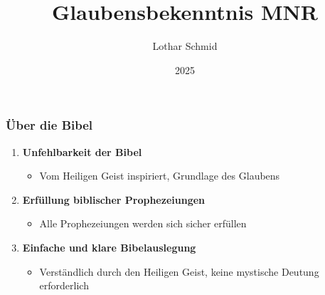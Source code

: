 \documentclass[aspectratio=43]{beamer}
\title{Glaubensbekenntnis MNR}
\author{Lothar Schmid}
\date{2025}
\begin{document}
\begin{frame}
    \maketitle    
\end{frame}

\begin{frame}
    \frametitle{Über die Bibel}  %
    \parbox{\textwidth}{%
            \begin{enumerate}
                \item \textbf{Unfehlbarkeit der Bibel}
                    \begin{itemize}              
                        \item Vom Heiligen Geist inspiriert, Grundlage des Glaubens
                    \end{itemize}
                    \vspace{0.25cm}
                \item \textbf{Erfüllung biblischer Prophezeiungen}
                    \begin{itemize}
                        \item Alle Prophezeiungen werden sich sicher erfüllen
                    \end{itemize}
                    \vspace{0.25cm}
                \item \textbf{Einfache und klare Bibelauslegung}
                    \begin{itemize}
                        \item Verständlich durch den Heiligen Geist, keine mystische Deutung erforderlich
                    \end{itemize}              
            \end{enumerate} 
            }
\end{frame}
\end{document}
